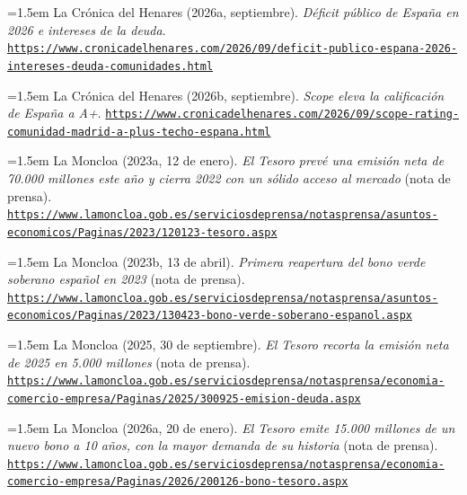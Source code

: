 \documentclass[10pt,a4paper]{article}
\begin{document}
\noindent\hangindent=1.5em La Crónica del Henares (2026a, septiembre). \textit{Déficit público de España en 2026 e intereses de la deuda}. \href{https://www.cronicadelhenares.com/2026/09/deficit-publico-espana-2026-intereses-deuda-comunidades.html}{\nolinkurl{https://www.cronicadelhenares.com/2026/09/deficit-publico-espana-2026-intereses-deuda-comunidades.html}}

\noindent\hangindent=1.5em La Crónica del Henares (2026b, septiembre). \textit{Scope eleva la calificación de España a A+}. \href{https://www.cronicadelhenares.com/2026/09/scope-rating-comunidad-madrid-a-plus-techo-espana.html}{\nolinkurl{https://www.cronicadelhenares.com/2026/09/scope-rating-comunidad-madrid-a-plus-techo-espana.html}}

\noindent\hangindent=1.5em La Moncloa (2023a, 12 de enero). \textit{El Tesoro prevé una emisión neta de 70.000 millones este año y cierra 2022 con un sólido acceso al mercado} (nota de prensa). \href{https://www.lamoncloa.gob.es/serviciosdeprensa/notasprensa/asuntos-economicos/Paginas/2023/120123-tesoro.aspx}{\nolinkurl{https://www.lamoncloa.gob.es/serviciosdeprensa/notasprensa/asuntos-economicos/Paginas/2023/120123-tesoro.aspx}}

\noindent\hangindent=1.5em La Moncloa (2023b, 13 de abril). \textit{Primera reapertura del bono verde soberano español en 2023} (nota de prensa). \href{https://www.lamoncloa.gob.es/serviciosdeprensa/notasprensa/asuntos-economicos/Paginas/2023/130423-bono-verde-soberano-espanol.aspx}{\nolinkurl{https://www.lamoncloa.gob.es/serviciosdeprensa/notasprensa/asuntos-economicos/Paginas/2023/130423-bono-verde-soberano-espanol.aspx}}

\noindent\hangindent=1.5em La Moncloa (2025, 30 de septiembre). \textit{El Tesoro recorta la emisión neta de 2025 en 5.000 millones} (nota de prensa). \href{https://www.lamoncloa.gob.es/serviciosdeprensa/notasprensa/economia-comercio-empresa/Paginas/2025/300925-emision-deuda.aspx}{\nolinkurl{https://www.lamoncloa.gob.es/serviciosdeprensa/notasprensa/economia-comercio-empresa/Paginas/2025/300925-emision-deuda.aspx}}

\noindent\hangindent=1.5em La Moncloa (2026a, 20 de enero). \textit{El Tesoro emite 15.000 millones de un nuevo bono a 10 años, con la mayor demanda de su historia} (nota de prensa). \href{https://www.lamoncloa.gob.es/serviciosdeprensa/notasprensa/economia-comercio-empresa/Paginas/2026/200126-bono-tesoro.aspx}{\nolinkurl{https://www.lamoncloa.gob.es/serviciosdeprensa/notasprensa/economia-comercio-empresa/Paginas/2026/200126-bono-tesoro.aspx}}
\end{document}

